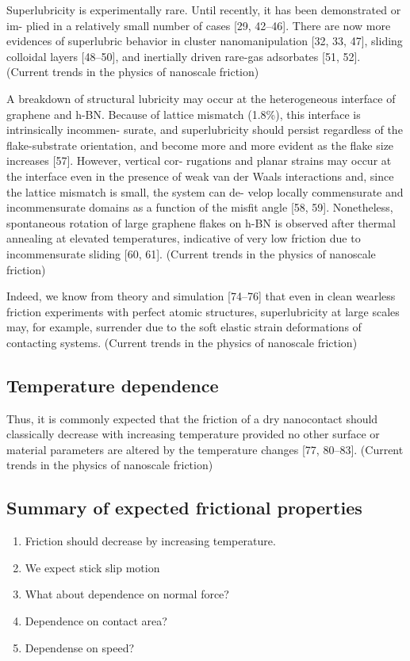 Superlubricity is experimentally rare. Until recently, it has been demonstrated or im- plied in a relatively small number of cases [29,
42–46]. There are now more evidences of superlubric behavior in cluster nanomanipulation [32, 33, 47], sliding colloidal layers [48–50], and
inertially driven rare-gas adsorbates [51, 52]. (Current trends in the physics of nanoscale friction)


A breakdown of structural lubricity may occur at the heterogeneous interface of graphene and h-BN. Because of lattice mismatch (1.8\%), this
interface is intrinsically incommen- surate, and superlubricity should persist regardless of the flake-substrate orientation, and become
more and more evident as the flake size increases [57]. However, vertical cor- rugations and planar strains may occur at the interface even
in the presence of weak van der Waals interactions and, since the lattice mismatch is small, the system can de- velop locally commensurate
and incommensurate domains as a function of the misfit angle [58, 59]. Nonetheless, spontaneous rotation of large graphene flakes on h-BN is
observed after thermal annealing at elevated temperatures, indicative of very low friction due to incommensurate sliding [60, 61]. (Current
trends in the physics of nanoscale friction)

Indeed, we know from theory and simulation [74–76] that even in clean wearless friction experiments with perfect atomic structures,
superlubricity at large scales may, for example, surrender due to the soft elastic strain deformations of contacting systems. (Current
trends in the physics of nanoscale friction)




\subsection{Temperature dependence}
Thus, it is commonly expected that the friction of a dry nanocontact should classically decrease with increasing temperature provided no
other surface or material parameters are altered by the temperature changes [77, 80–83]. (Current trends in the physics of nanoscale
friction)


\subsection{Summary of expected frictional properties}
\begin{enumerate}
  \item Friction should decrease by increasing temperature.
  \item We expect stick slip motion
  \item What about dependence on normal force?
  \item Dependence on contact area?
  \item Dependense on speed? 
\end{enumerate}

